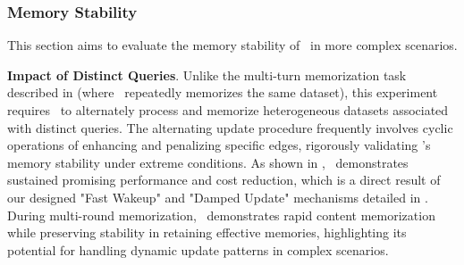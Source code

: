 \subsubsection{Memory Stability} 
\label{ms}
\begin{table}
    \centering
    \caption{Accuracy of \ours~under complex multi-turn memorization settings (Multi-Hop QA \& GPT-4o-mini). "Origin" represents the original question, while "Different" denotes the modified question (as shown in \textbf{Setup} (3) in ).}
    \label{tab:alternating-performance}
\end{table}

This section aims to evaluate the memory stability of \ours~in more complex scenarios. 

\textbf{Impact of Distinct Queries}. Unlike the multi-turn memorization task described in  (where \ours~repeatedly memorizes the same dataset), this experiment requires \ours~to alternately process and memorize heterogeneous datasets associated with distinct queries. The alternating update procedure frequently involves cyclic operations of enhancing and penalizing specific edges, rigorously validating \ours's memory stability under extreme conditions. As shown in , \ours~demonstrates sustained promising performance and cost reduction, which is a direct result of our designed "Fast Wakeup" and "Damped Update" mechanisms detailed in . During multi-round memorization, \ours~demonstrates rapid content memorization while preserving stability in retaining effective memories, highlighting its potential for handling dynamic update patterns in complex scenarios.

